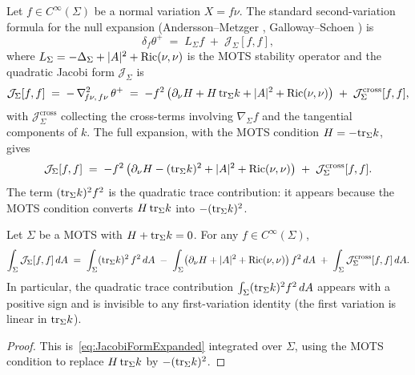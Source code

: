 Let $f\in C^\infty(\Sigma)$ be a normal variation $X = f\nu$. The standard second-variation formula for the null expansion (Andersson--Metzger \cite{anderssonmetzger2009}, Galloway--Schoen \cite{gallowayschoen2006}) is
\begin{equation}\label{eq:StandardSecondVariation}
    \delta_f\theta^+ \;=\; L_\Sigma f \;+\;\mathcal J_\Sigma[f,f],
\end{equation}
where $L_\Sigma = -\Delta_\Sigma + |A|^2 + \mathrm{Ric}(\nu,\nu)$ is the MOTS stability operator and the quadratic Jacobi form $\mathcal J_\Sigma$ is
\begin{equation}\label{eq:JacobiForm}
    \mathcal J_\Sigma[f,f]
    \;=\;
    -\,\nabla^2_{\!f\nu,\,f\nu}\,\theta^+
    \;=\;
    -f^2\,\bigl(\partial_\nu H + H\,\mathrm{tr}_\Sigma k + |A|^2 + \mathrm{Ric}(\nu,\nu)\bigr)
    \;+\;\mathcal J_\Sigma^{\mathrm{cross}}[f,f],
\end{equation}
with $\mathcal J_\Sigma^{\mathrm{cross}}$ collecting the cross-terms involving $\nabla_\Sigma f$ and the tangential components of $k$. The full expansion, with the MOTS condition $H=-\mathrm{tr}_\Sigma k$, gives
\begin{equation}\label{eq:JacobiFormExpanded}
    \mathcal J_\Sigma[f,f]
    \;=\;
    -f^2\,\bigl(\partial_\nu H - (\mathrm{tr}_\Sigma k)^2 + |A|^2 + \mathrm{Ric}(\nu,\nu)\bigr)
    \;+\;\mathcal J_\Sigma^{\mathrm{cross}}[f,f] .
\end{equation}
The term $(\mathrm{tr}_\Sigma k)^2 f^2$ is the quadratic trace contribution: it appears because the MOTS condition converts $H\,\mathrm{tr}_\Sigma k$ into $-(\mathrm{tr}_\Sigma k)^2$.

\begin{lemma}\label{lem:QuadraticTrace}
Let $\Sigma$ be a MOTS with $H+\mathrm{tr}_\Sigma k=0$. For any $f\in C^\infty(\Sigma)$,
\begin{equation}\label{eq:QuadraticTraceLemma}
    \int_\Sigma \mathcal J_\Sigma[f,f]\,dA
    \;=\;
    \int_\Sigma (\mathrm{tr}_\Sigma k)^2\,f^2\,dA
    \;-\;\int_\Sigma\bigl(\partial_\nu H + |A|^2 + \mathrm{Ric}(\nu,\nu)\bigr)\,f^2\,dA
    \;+\;\int_\Sigma\mathcal J_\Sigma^{\mathrm{cross}}[f,f]\,dA .
\end{equation}
In particular, the quadratic trace contribution $\int_\Sigma(\mathrm{tr}_\Sigma k)^2 f^2\,dA$ appears with a positive sign and is invisible to any first-variation identity (the first variation is linear in $\mathrm{tr}_\Sigma k$).
\end{lemma}

\begin{proof}
This is~\eqref{eq:JacobiFormExpanded} integrated over $\Sigma$, using the MOTS condition to replace $H\,\mathrm{tr}_\Sigma k$ by $-(\mathrm{tr}_\Sigma k)^2$.
\end{proof}

